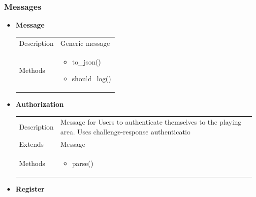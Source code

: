 \documentclass[11pt]{article}
\begin{document}
\subsubsection{Messages}\label{messages}

\begin{itemize}
\item
  \textbf{Message} 
  \begin{longtable}[]{@{}ll@{}}
  \toprule
  \endhead
  \begin{minipage}[t]{0.40\columnwidth}\raggedright
  Description\strut
  \end{minipage} & \begin{minipage}[t]{0.54\columnwidth}\raggedright
  Generic message\strut
  \end{minipage}\tabularnewline
  \begin{minipage}[t]{0.40\columnwidth}\raggedright
  Methods\strut
  \end{minipage} & \begin{minipage}[t]{0.54\columnwidth}\raggedright
  \begin{itemize}
  	\item to\_json()
  	\item should\_log()
  \end{itemize}\strut
  \end{minipage}\tabularnewline
  \bottomrule
  \end{longtable}

\item

  \textbf{Authorization} 
  \begin{longtable}[]{@{}ll@{}}
  \toprule
  \endhead
  \begin{minipage}[t]{0.40\columnwidth}\raggedright
  Description\strut
  \end{minipage} & \begin{minipage}[t]{0.54\columnwidth}\raggedright
  Message for Users to authenticate themselves to the playing area. Uses
  challenge-response authenticatio\strut
  \end{minipage}\tabularnewline
  \begin{minipage}[t]{0.40\columnwidth}\raggedright
  Extends\strut
  \end{minipage} & \begin{minipage}[t]{0.54\columnwidth}\raggedright
  Message\strut
  \end{minipage}\tabularnewline
  \begin{minipage}[t]{0.40\columnwidth}\raggedright
  Methods\strut
  \end{minipage} & \begin{minipage}[t]{0.54\columnwidth}\raggedright
  \begin{itemize}
  	\item parse()
  \end{itemize}\strut
  \end{minipage}\tabularnewline
  \bottomrule
  \end{longtable}
\item
  \textbf{Register}


\end{itemize}
\end{document}
